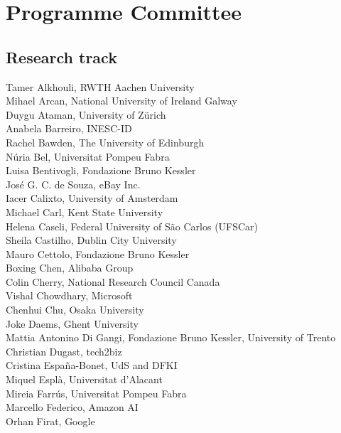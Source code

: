 \documentclass[a4paper,11pt,twoside]{book}
\begin{document}
\section*{Programme Committee}
\subsection*{Research track}

\noindent Tamer Alkhouli, RWTH Aachen University\\
\noindent Mihael Arcan, National University of Ireland Galway\\
\noindent Duygu Ataman, University of Zürich\\
\noindent Anabela Barreiro, INESC-ID\\
\noindent Rachel Bawden, The University of Edinburgh\\
\noindent Núria Bel, Universitat Pompeu Fabra\\
\noindent Luisa Bentivogli, Fondazione Bruno Kessler\\
\noindent José G. C. de Souza, eBay Inc.\\
\noindent Iacer Calixto, University of Amsterdam\\
\noindent Michael Carl, Kent State University\\
\noindent Helena Caseli, Federal University of São Carlos (UFSCar)\\
\noindent Sheila Castilho, Dublin City University\\
\noindent Mauro Cettolo, Fondazione Bruno Kessler\\
\noindent Boxing Chen, Alibaba Group\\
\noindent Colin Cherry, National Research Council Canada\\
\noindent Vishal Chowdhary, Microsoft\\
\noindent Chenhui Chu, Osaka University\\
\noindent Joke Daems, Ghent University\\
\noindent Mattia Antonino Di Gangi, Fondazione Bruno Kessler, University of Trento\\
\noindent Christian Dugast, tech2biz\\
\noindent Cristina España-Bonet, UdS and DFKI\\
\noindent Miquel Esplà, Universitat d'Alacant\\
\noindent Mireia Farrús, Universitat Pompeu Fabra\\
\noindent Marcello Federico, Amazon AI\\
\noindent Orhan Firat, Google\\
\end{document}
